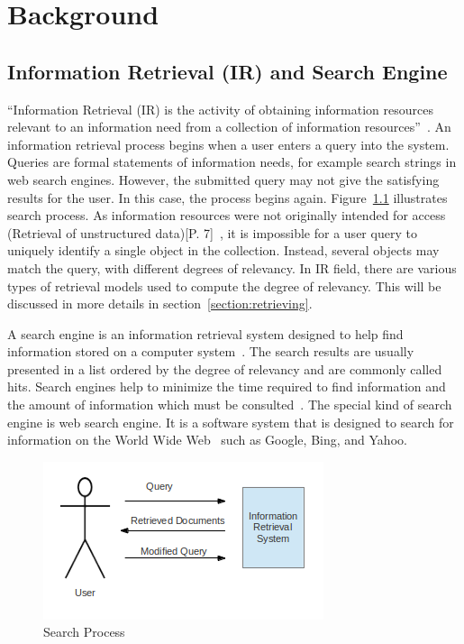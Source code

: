 
\chapter{Background}\label{section:background}

\section{Information Retrieval (IR) and Search Engine}\label{section:IR}
``Information Retrieval (IR) is the activity of obtaining information resources relevant to an information need from a collection of information resources''~\cite{IR}. 
An information retrieval process begins when a user 
enters a query into the system. Queries are formal statements of information needs, for example search strings in web search engines. However, the 
submitted query may not give the satisfying results for the user. In this case, the process begins again. Figure~\ref{fig:retrieval_process} illustrates
search process. As information resources were not originally intended for access (Retrieval of unstructured data)[P. 7]~\cite{IRlecture}, 
it is impossible for a user query to uniquely identify a single object in the collection. Instead, several objects may match the query, 
with different degrees of relevancy. In IR field, there are various types of retrieval models used to compute the degree of relevancy. This will
be discussed in more details in section~\ref{section:retrieving}.

A search engine is an information retrieval system designed to help find information stored on a computer system~\cite{searchengine}. The search results are usually 
presented in a list ordered by the degree of relevancy and are commonly called hits. 
Search engines help to minimize the time required to find information and the amount of 
information which must be consulted~\cite{searchengine}. The special kind of search engine is 
web search engine. It is a software system that is designed to search for information on the World Wide Web~\cite{websearchengine} such as Google, 
Bing, and Yahoo.

\begin{figure}
\centering
\includegraphics[scale=1]{./figures/retrieval_process.png}
\caption{Search Process} \label{fig:retrieval_process}
\end{figure}

